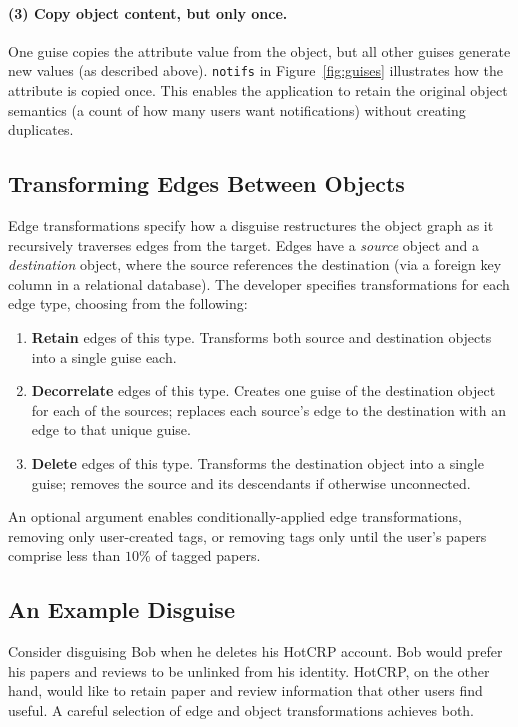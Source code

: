 \paragraph{(3) Copy object content, but only once.}
%
One guise copies the attribute value from the object, but all other guises generate new
values (as described above).
%
\texttt{notifs} in Figure~\ref{fig:guises} illustrates how the attribute is copied once.
%
This enables the application to retain the original object semantics (\eg a count of how many
users want notifications) without creating duplicates.
%

\subsection{Transforming Edges Between Objects}
\label{design:edgepol}
%
Edge transformations specify how a disguise restructures the object graph as it
recursively traverses edges from the target.
%
Edges have a \emph{source} object and a \emph{destination} object, where the source references
the destination (\eg via a foreign key column in a relational database).
%
The developer specifies transformations for each edge type, choosing from the following:
%
\begin{enumerate}[nosep]
    \item \textbf{Retain} edges of this type.
    Transforms both source and destination objects into a single guise each.
    \item \textbf{Decorrelate} edges of this type.
    Creates one guise of the destination object for each of the sources; replaces each source's
    edge to the destination with an edge to that unique guise.
    \item \textbf{Delete} edges of this type.
    Transforms the destination object into a single guise; removes the source and its descendants
    if otherwise unconnected.
\end{enumerate}
%
An optional argument enables conditionally-applied edge transformations, \eg removing only
user-created tags, or removing tags only until the user's papers comprise less than
$10$\% of tagged papers. %
%

\subsection{An Example Disguise}
\label{design:eg}
%
Consider disguising Bob when he deletes his HotCRP account.
%
Bob would prefer his papers and reviews to be unlinked from his identity.
%
HotCRP, on the other hand, would like to retain paper and review information that other users
find useful.
%
A careful selection of edge and object transformations achieves both.
%

